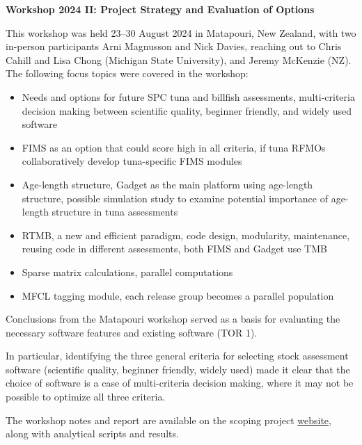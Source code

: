 \documentclass{SCreport}
\newcommand\tree
{https://github.com/PacificCommunity/ofp-sam-transition-plan/tree/main}
\begin{document}
\vspace{2ex}

\textbf{Workshop 2024 II: Project Strategy and Evaluation of Options}

\vspace{1ex}

This workshop was held 23--30 August 2024 in Matapouri, New Zealand, with two
in-person participants Arni Magnusson and Nick Davies, reaching out to Chris
Cahill and Lisa Chong (Michigan State University), and Jeremy McKenzie (NZ). The
following focus topics were covered in the workshop:

\begin{itemize}
  \item Needs and options for future SPC tuna and billfish assessments,
  multi-criteria decision making between scientific quality, beginner friendly,
  and widely used software
  \item FIMS as an option that could score high in all criteria, if tuna RFMOs
  collaboratively develop tuna-specific FIMS modules
  \item Age-length structure, Gadget as the main platform using age-length
  structure, possible simulation study to examine potential importance of
  age-length structure in tuna assessments
  \item RTMB, a new and efficient paradigm, code design, modularity,
  maintenance, reusing code in different assessments, both FIMS and Gadget use
  TMB
  \item Sparse matrix calculations, parallel computations
  \item MFCL tagging module, each release group becomes a parallel population
\end{itemize}

\vspace{2ex}

Conclusions from the Matapouri workshop served as a basis for evaluating the
necessary software features and existing software (TOR 1).

In particular, identifying the three general criteria for selecting stock
assessment software (scientific quality, beginner friendly, widely used) made it
clear that the choice of software is a case of multi-criteria decision making,
where it may not be possible to optimize all three criteria.

The workshop notes and report are available on the scoping project
\href{\tree/workshops/2024-08-matapouri}{website}, along with analytical scripts
and results.
\end{document}
